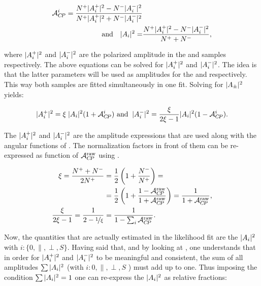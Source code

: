 \begin{align}
  \label{acp_param}
\mathcal{A}_{C\!P}^{i} = \frac{{N^+}|{A}_{i}^+|^2 - {N^-}|{A}_{i}^-|^2}{{N^+}|{A}_{i}^+|^2 + {N^-}|{A}_{i}^-|^2 } & \\
\text{and} \quad |{A}_{i}|^2 = &\frac{ {N^+} |{A}_{i}^+|^2 - {N^-}|{A}_{i}^-|^2}{{N^+} + {N^-}},
\end{align}

\noindent where $|{A}_{i}^+|^2$ and $|{A}_{i}^-|^2$ are the polarized amplitude in the \BsbarJpsiKst
and \BsJpsiKst samples respectively. The above equations can be solved for $|{A}_{i}^+|^2$ and $|{A}_{i}^-|^2$. The idea
is that the latter parameters will be used as amplitudes for the \BsbarJpsiKst and \BsJpsiKst \pdfs respectively.
This way both samples are fitted simultaneously in one fit. Solving  for $|{A}_{\pm}|^2$ yields:

\begin{equation}
|{A}_{i}^+|^2 = \xi \; |{A}_{i}|^2 (1+\mathcal{A}_{C\!P}^{i}) \,\, \text{and}\;\; |{A}_{i}^-|^2 = \frac{\xi}{2\xi-1} |{A}_{i}|^2 (1-\mathcal{A}_{C\!P}^{i}).
\label{acp_free}
\end{equation}

\noindent The $|{A}_{i}^+|^2$ and $|{A}_{i}^-|^2$ are the amplitude expressions that are used along with the angular functions of .
The normalization factors in front of them can be re-expressed as function of $\mathcal{A}_{C\!P}^{\text{raw}}$ using .

\begin{align}
\xi = \frac{{N^+}+{N^-}}{2{N^+}} &= \frac{1}{2}\left( 1 + \frac{N^{-}_{}}{N^{+}_{}}\right) = \nonumber \\
                                     &= \frac{1}{2}\left( 1 + \frac{1-\mathcal{A}_{C\!P}^{\text{raw}}}{1+\mathcal{A}_{C\!P}^{\text{raw}}}\right) =
                                        \frac{1}{1+\mathcal{A}_{C\!P}^{\text{raw}}},  \\
\frac{\xi}{2\xi-1} = \frac{1}{2-\nicefrac{1}{\xi}} &= \frac{1}{1-\sum_i\mathcal{A}_{C\!P}^{\text{raw}}}.
\label{amp_norms}
\end{align}

\noindent Now, the quantities that are actually estimated in the likelihood fit are the $|{A}_{i}|^2$ with $i:\{0,\parallel,\perp,S\}$.
Having said that, and by looking at , one understands that in order for $|{A}_{i}^+|^2$ and $|{A}_{i}^-|^2$
to be meaningful and consistent, the sum of all amplitudes $\sum|{A}_{i}|^2$ (with $i:{0,\parallel,\perp,S}$ ) must add up to one.
Thus imposing the condition $\sum|{A}_{i}|^2 = 1$ one can re-express the $|{A}_{i}|^2$ as relative fractions:

